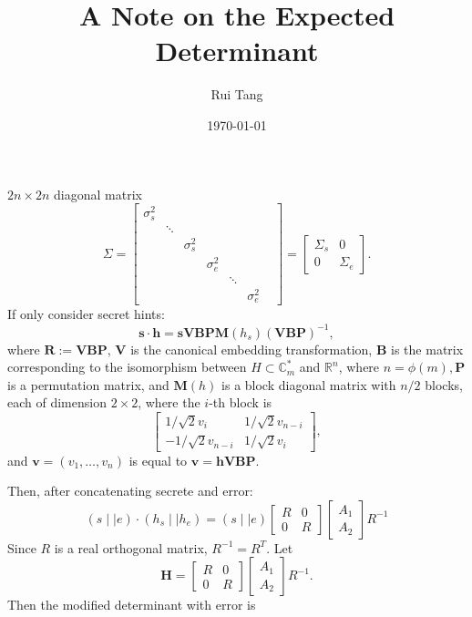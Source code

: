 \documentclass[12pt]{article}
\title{A Note on the Expected Determinant}
\author{Rui Tang}
\date{\today}
\begin{document}
\maketitle

$2n\times2n$ diagonal matrix
$$
\Sigma=
\begin{bmatrix}
\sigma_{s}^2&&&&&\\ 
&\ddots &&&&&\\
&&\sigma^2_{s}&&& \\
&&&\sigma_{e}^2&& \\
&&&&\ddots& \\
&&&&&\sigma_{e}^2
\end{bmatrix}
=
\begin{bmatrix}
\Sigma_{s}&0 \\
0&\Sigma_{e}
\end{bmatrix}.
$$
If only consider secret hints:
$$
\mathbf{s}\cdot \mathbf{h}=\mathbf{s}\mathbf{V}\mathbf{B}\mathbf{P}\mathbf{M}(h_{s})(\mathbf{V}\mathbf{B}\mathbf{P})^{-1},
$$
where $\mathbf{R}:=\mathbf{V}\mathbf{B}\mathbf{P}$, $\mathbf{V}$ is the canonical embedding transformation, $\mathbf{B}$ is the matrix corresponding to the isomorphism between $H \subset \mathbb{C}_m^*$ and $\mathbb{R}^n$, where $n=\phi(m), \mathbf{P}$ is a permutation matrix, and $\mathbf{M}(h)$ is a block diagonal matrix with $n / 2$ blocks, each of dimension $2 \times 2$, where the $i$-th block is
$$
\begin{bmatrix}
1 / \sqrt{2} v_i & 1 / \sqrt{2} v_{n-i} \\
-1 / \sqrt{2} v_{n-i} & 1 / \sqrt{2} v_i
\end{bmatrix},
$$
and $\mathbf{v}=\left(v_1, \ldots, v_n\right)$ is equal to $\mathbf{v}=\mathbf{h V B P}$.

Then, after concatenating secrete and error:
$$
(s\mid \mid e)\cdot (h_{s}\mid\mid h_{e})=(s\mid \mid e)
\begin{bmatrix}
R&0 \\
0&R
\end{bmatrix}
\begin{bmatrix}
A_{1} \\
A_{2}
\end{bmatrix}
R^{-1}
$$
Since $R$ is a real orthogonal matrix, $R^{-1}=R^{T}$. Let 
$$
\mathbf{H}=
\begin{bmatrix}
R&0 \\
0&R
\end{bmatrix}
\begin{bmatrix}
A_{1} \\
A_{2}
\end{bmatrix}
R^{-1}.
$$
Then the modified determinant with error is
\end{document}
